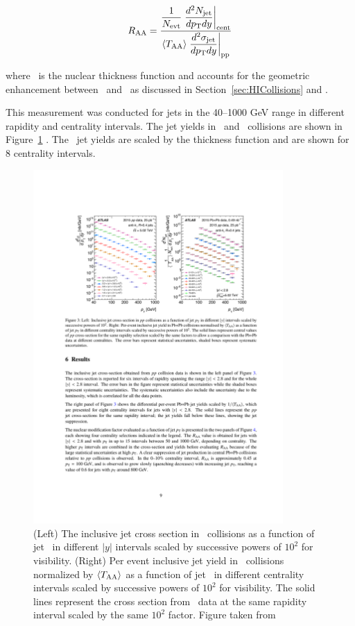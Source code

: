 \begin{align}
\mbox{$R_{\rm AA}$}  = \dfrac{\dfrac{1}{N_{\rm evt}} \left. \dfrac{d^2 N_{\rm jet}}{d\mbox{$p_{\mathrm{T}}$} dy} \right|_{\rm cent}}{ \langle T_{\rm AA} \rangle \left. \dfrac{d^2\sigma_{\rm jet}}{d\mbox{$p_{\mathrm{T}}$} dy} \right|_{\rm pp}}
\end{align}

where \TAA\ is the nuclear thickness function and accounts for the geometric enhancement between \pp\ and \pbpb\ as discussed in Section~\ref{sec:HICollisions} and \cite{doi:10.1146/annurev.nucl.57.090506.123020}. 

This measurement was conducted for jets in the 40--1000 GeV range in different rapidity and centrality intervals. The jet yields in \pp\ and \pbpb\ collisions are shown in Figure~\ref{fig:jet_yields} . The \pbpb\ jet yields are scaled by the thickness function and are shown for 8 centrality intervals. 

\begin{figure}[htbp]
\begin{center}
\includegraphics[width=0.85\textwidth]{figures/jetMeasurements/jetYields}
\caption{(Left) The inclusive jet cross section in \pp\ collisions as a function of jet \pt\ in different $|y|$ intervals scaled by successive powers of $10^2$ for visibility. (Right) Per event inclusive jet yield in \pbpb\ collisions normalized by $\langle \mbox{$T_{\mathrm{AA}}$} \rangle$ as a function of jet \pt\ in different centrality intervals scaled by successive powers of $10^2$ for visibility. The solid lines represent the cross section from \pp\ data at the same rapidity interval scaled by the same $10^2$ factor.  Figure taken from \cite{2019108}}
\label{fig:jet_yields}
\end{center}
\end{figure}


